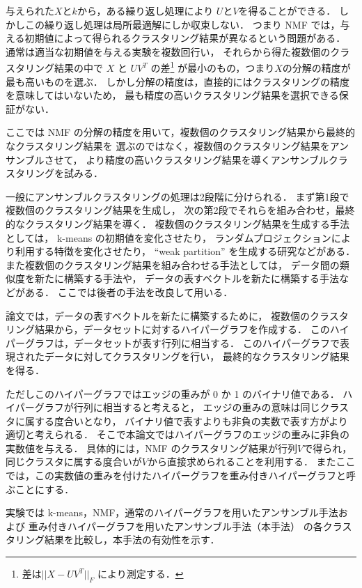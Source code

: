 \documentclass[japanese]{jnlp_1.3e}
\begin{document}
与えられた\( X \)と\( k \)から，ある繰り返し処理により
\( U \)と\( V \)を得ることができる\cite{lee00algorithms}．
しかしこの繰り返し処理は局所最適解にしか収束しない．
つまり NMF では，与える初期値によって得られるクラスタリング結果が異なるという問題がある．
通常は適当な初期値を与える実験を複数回行い，
それらから得た複数個のクラスタリング結果の中で
\( X \) と \( U V^{T} \) の差\footnote{差は\( || X - U V^{T} ||_{F} \) により測定する．}
が最小のもの，つまり\( X \)の分解の精度が最も高いものを選ぶ．
しかし分解の精度は，直接的にはクラスタリングの精度を意味してはいないため，
最も精度の高いクラスタリング結果を選択できる保証がない．

ここでは NMF の分解の精度を用いて，複数個のクラスタリング結果から最終的なクラスタリング結果を
選ぶのではなく，複数個のクラスタリング結果をアンサンブルさせて，
より精度の高いクラスタリング結果を導くアンサンブルクラスタリングを試みる．

一般にアンサンブルクラスタリングの処理は2段階に分けられる．
まず第1段で複数個のクラスタリング結果を生成し，
次の第2段でそれらを組み合わせ，最終的なクラスタリング結果を導く．
複数個のクラスタリング結果を生成する手法としては，
k-means の初期値を変化させたり\cite{fred02data}，
ランダムプロジェクションにより利用する特徴を変化させたり\cite{fern_clustensem03}，
``weak partition'' を生成する研究などがある\cite{topchy03combining}．  
また複数個のクラスタリング結果を組み合わせる手法としては，
データ間の類似度を新たに構築する手法\cite{fred02data}や，
データの表すベクトルを新たに構築する手法\cite{strehl02}などがある．
ここでは後者の手法を改良して用いる．

論文\cite{strehl02}では，データの表すベクトルを新たに構築するために，
複数個のクラスタリング結果から，データセットに対するハイパーグラフを作成する．
このハイパーグラフは，データセットが表す行列に相当する．
このハイパーグラフで表現されたデータに対してクラスタリングを行い，
最終的なクラスタリング結果を得る．

ただしこのハイパーグラフではエッジの重みが 0 か 1 のバイナリ値である．
ハイパーグラフが行列に相当すると考えると，
エッジの重みの意味は同じクラスタに属する度合いとなり，
バイナリ値で表すよりも非負の実数で表す方がより適切と考えられる．
そこで本論文ではハイパーグラフのエッジの重みに非負の実数値を与える．
具体的には，NMF のクラスタリング結果が行列\( V \)で得られ，
同じクラスタに属する度合いが\( V \)から直接求められることを利用する．
またここでは，この実数値の重みを付けたハイパーグラフを重み付きハイパーグラフと呼ぶことにする．

実験では k-means，NMF，通常のハイパーグラフを用いたアンサンブル手法および
重み付きハイパーグラフを用いたアンサンブル手法（本手法）
の各クラスタリング結果を比較し，本手法の有効性を示す．
\end{document}
